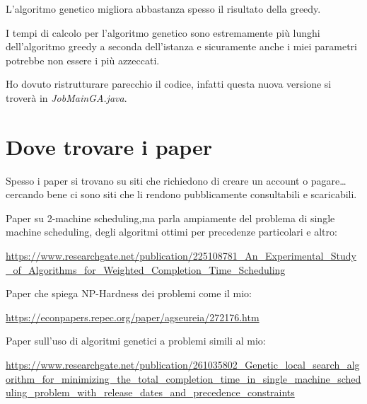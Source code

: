 \documentclass[12pt, letterpaper]{article}
\begin{document}
L'algoritmo genetico migliora abbastanza spesso il risultato della greedy.

I tempi di calcolo per l'algoritmo genetico sono estremamente più lunghi dell'algoritmo greedy a seconda dell'istanza e sicuramente anche i miei parametri potrebbe non essere i più azzeccati.

Ho dovuto ristrutturare parecchio il codice, infatti questa nuova versione si troverà in \textit{JobMainGA.java}.

\section{Dove trovare i paper}
Spesso i paper si trovano su siti che richiedono di creare un account o pagare\ldots cercando bene ci sono siti che li rendono pubblicamente consultabili e scaricabili.

Paper su 2-machine scheduling,ma parla ampiamente del problema di single machine scheduling, degli algoritmi ottimi per precedenze particolari e altro\cite{Baev}:

\medskip
\url{https://www.researchgate.net/publication/225108781_An_Experimental_Study_of_Algorithms_for_Weighted_Completion_Time_Scheduling}

\medskip
Paper che spiega NP-Hardness dei problemi come il mio\cite{Lenstra}: 

\medskip
\url{https://econpapers.repec.org/paper/agseureia/272176.htm}

\medskip
Paper sull'uso di algoritmi genetici a problemi simili al mio\cite{Zaidi}: 

\medskip
\url{https://www.researchgate.net/publication/261035802_Genetic_local_search_algorithm_for_minimizing_the_total_completion_time_in_single_machine_scheduling_problem_with_release_dates_and_precedence_constraints}

\printbibliography
\end{document}
